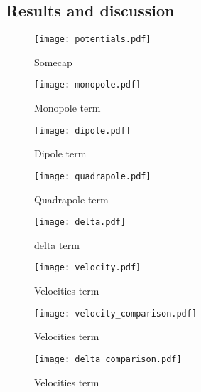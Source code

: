 \subsection{Results and discussion}\label{sec:m3:results}
    

    \begin{figure}
        \texttt{[image: potentials.pdf]}
        \caption{Somecap}
        \label{fig:m3:potentials}
    \end{figure}

    \begin{figure}
        \texttt{[image: monopole.pdf]}
        \caption{Monopole term}
        \label{fig:m3:monopole}
    \end{figure}

    \begin{figure}
        \texttt{[image: dipole.pdf]}
        \caption{Dipole term}
        \label{fig:m3:dipole}
    \end{figure}

    \begin{figure}
        \texttt{[image: quadrapole.pdf]}
        \caption{Quadrapole term}
        \label{fig:m3:quadrapole}
    \end{figure}

    \begin{figure}
        \texttt{[image: delta.pdf]}
        \caption{delta term}
        \label{fig:m3:delta}
    \end{figure}

    \begin{figure}
        \texttt{[image: velocity.pdf]}
        \caption{Velocities term}
        \label{fig:m3:velocity}
    \end{figure}

    \begin{figure}
        \texttt{[image: velocity\_comparison.pdf]}
        \caption{Velocities term}
        \label{fig:m3:velocity_comparison}
    \end{figure}

    \begin{figure}
        \texttt{[image: delta\_comparison.pdf]}
        \caption{Velocities term}
        \label{fig:m3:delta_comparison}
    \end{figure}

